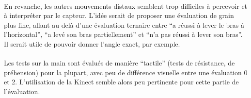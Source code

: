 \paragraph{}En revanche, les autres mouvements distaux semblent trop difficiles à percevoir et à interpréter par le capteur.
L’idée serait de proposer une évaluation de grain plus fine, allant au delà d’une évaluation ternaire entre 
“a réussi à lever le bras à l’horizontal”, “a levé son bras partiellement” et “n’a pas réussi à lever son bras”. 
Il serait utile de pouvoir donner l’angle exact, par exemple.   

\paragraph{}Les tests sur la main sont évalués de manière “tactile” (tests de résistance, de préhension) pour la plupart, 
avec peu de différence visuelle entre une évaluation 0 et 2. L’utilisation de la Kinect semble alors peu pertinente
pour cette partie de l’évaluation.
